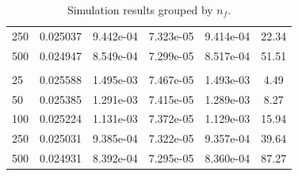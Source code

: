 \begin{table}[tph]
\begin{tabular}{lccccc}
     250 & 0.025037 & 9.442e-04 & 7.323e-05 & 9.414e-04 & 22.34 \\
     500 & 0.024947 & 8.549e-04 & 7.299e-05 & 8.517e-04 & 51.51 \\
    \addlinespace
    \multicolumn{6}{l}{$n_f = 800$, $\text{Reference Price} = 0.024095$} \\
      25 & 0.025588 & 1.495e-03 & 7.467e-05 & 1.493e-03 & 4.49 \\
      50 & 0.025385 & 1.291e-03 & 7.415e-05 & 1.289e-03 & 8.27 \\
     100 & 0.025224 & 1.131e-03 & 7.372e-05 & 1.129e-03 & 15.94 \\
     250 & 0.025031 & 9.385e-04 & 7.322e-05 & 9.357e-04 & 39.64 \\
     500 & 0.024931 & 8.392e-04 & 7.295e-05 & 8.360e-04 & 87.27 \\
    \hline
  \end{tabular}
  \caption{Simulation results grouped by $n_f$.}
  \label{tab:sim_results}
\end{table}
